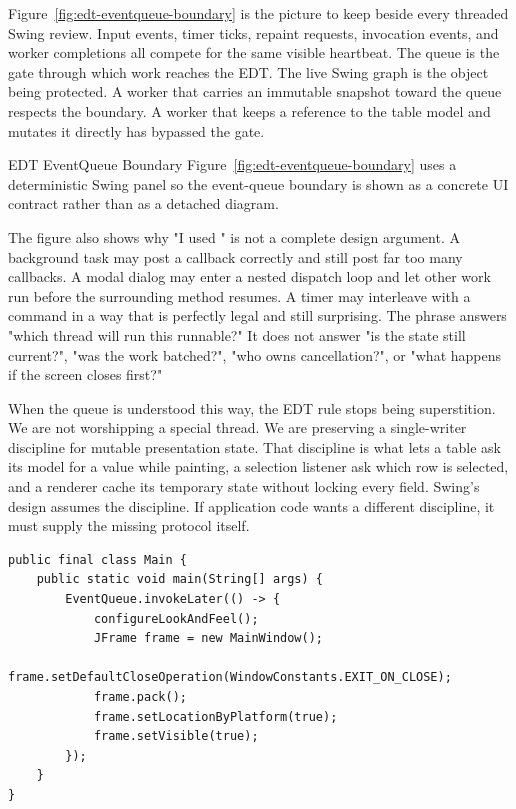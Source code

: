 Figure~\ref{fig:edt-eventqueue-boundary} is the picture to keep beside every threaded Swing review. Input events, timer ticks, repaint requests, invocation events, and worker completions all compete for the same visible heartbeat. The queue is the gate through which work reaches the EDT. The live Swing graph is the object being protected. A worker that carries an immutable snapshot toward the queue respects the boundary. A worker that keeps a reference to the table model and mutates it directly has bypassed the gate.

\begin{examplebox}{EDT EventQueue Boundary}
Figure~\ref{fig:edt-eventqueue-boundary} uses a deterministic Swing panel so the event-queue boundary is shown as a concrete UI contract rather than as a detached diagram.
\end{examplebox}

The figure also shows why "I used " is not a complete design argument. A background task may post a callback correctly and still post far too many callbacks. A modal dialog may enter a nested dispatch loop and let other work run before the surrounding method resumes. A timer may interleave with a command in a way that is perfectly legal and still surprising. The phrase  answers "which thread will run this runnable?" It does not answer "is the state still current?", "was the work batched?", "who owns cancellation?", or "what happens if the screen closes first?"

When the queue is understood this way, the EDT rule stops being superstition. We are not worshipping a special thread. We are preserving a single-writer discipline for mutable presentation state. That discipline is what lets a table ask its model for a value while painting, a selection listener ask which row is selected, and a renderer cache its temporary state without locking every field. Swing's design assumes the discipline. If application code wants a different discipline, it must supply the missing protocol itself.

\begin{lstlisting}[caption={A safe startup skeleton.}]
public final class Main {
    public static void main(String[] args) {
        EventQueue.invokeLater(() -> {
            configureLookAndFeel();
            JFrame frame = new MainWindow();
            frame.setDefaultCloseOperation(WindowConstants.EXIT_ON_CLOSE);
            frame.pack();
            frame.setLocationByPlatform(true);
            frame.setVisible(true);
        });
    }
}
\end{lstlisting}

